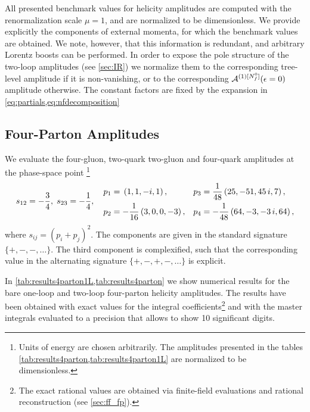 All presented benchmark values for helicity amplitudes are computed with the renormalization scale $\mu=1$,
and are normalized to be dimensionless.
We provide explicitly the components of external momenta, for which the benchmark values are obtained.
We note, however, that this information is redundant, and arbitrary Lorentz boosts
can be performed.
In order to expose the pole structure of the two-loop amplitudes (see \cref{sec:IR}) we normalize them to
the corresponding tree-level amplitude if
it is non-vanishing, or to the corresponding $\mathcal{A}^{(1)[N_f^0]}(\epsilon=0)$ amplitude otherwise.
The constant factors are fixed by the expansion in \cref{eq:partials,eq:nfdecomposition}

\subsection{Four-Parton Amplitudes}

We evaluate the four-gluon, two-quark two-gluon and four-quark
amplitudes at the phase-space point%
\footnote{Units of energy are chosen arbitrarily.
  The amplitudes presented in the tables \cref{tab:results4parton,tab:results4parton1L}
  are normalized to be dimensionless.
}
%
\begin{equation}
  s_{12}=-\frac{3}{4}, \; s_{23}=-\frac{1}{4},
  \quad
  \begin{aligned}[c]
    p_1 &= \vphantom{\frac{1}{48}}\left(1,1,-i,1\right), \\
    p_2 &= -\frac{1}{16}\left(3,0,0,-3\right), \\
  \end{aligned}
  \quad
  \begin{aligned}[c]
    p_3 &= \frac{1}{48}\left(25,-51,45\,i,7\right),\\
    p_4 &= -\frac{1}{48}\left(64,-3,-3\,i, 64\right), \\
  \end{aligned}
  \label{eq:EvalPoint4}
\end{equation}
where $s_{ij}=(p_i+p_j)^2$. The components are given in the standard signature $\{+,-,-,\ldots{}\}$.
The third component is complexified, such that the corresponding value in the alternating signature $\{+,-,+,-,\ldots{}\}$ 
is explicit.

In \cref{tab:results4parton1L,tab:results4parton} we show numerical results for
the bare one-loop and two-loop four-parton helicity amplitudes.
The results have been obtained with exact values for the 
integral coefficients\footnote{
  The exact rational values are obtained via finite-field evaluations and rational reconstruction (see \cref{sec:ff_fp}).
} 
and with the master integrals 
evaluated to a precision that allows to show 10
significant digits.

